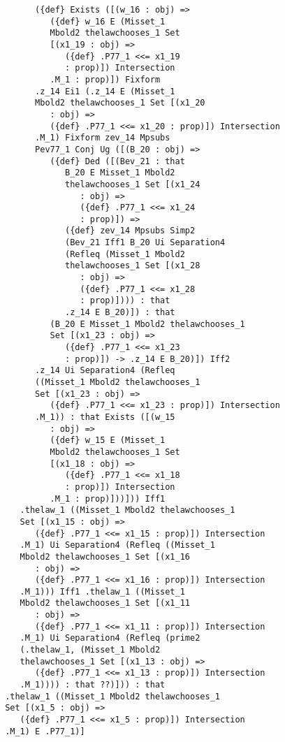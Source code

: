 \documentclass[12pt]{article}
\begin{document}
\begin{verbatim}
             ({def} Exists ([(w_16 : obj) => 
                ({def} w_16 E (Misset_1 
                Mbold2 thelawchooses_1 Set 
                [(x1_19 : obj) => 
                   ({def} .P77_1 <<= x1_19 
                   : prop)]) Intersection 
                .M_1 : prop)]) Fixform 
             .z_14 Ei1 (.z_14 E (Misset_1 
             Mbold2 thelawchooses_1 Set [(x1_20 
                : obj) => 
                ({def} .P77_1 <<= x1_20 : prop)]) Intersection 
             .M_1) Fixform zev_14 Mpsubs 
             Pev77_1 Conj Ug ([(B_20 : obj) => 
                ({def} Ded ([(Bev_21 : that 
                   B_20 E Misset_1 Mbold2 
                   thelawchooses_1 Set [(x1_24 
                      : obj) => 
                      ({def} .P77_1 <<= x1_24 
                      : prop)]) => 
                   ({def} zev_14 Mpsubs Simp2 
                   (Bev_21 Iff1 B_20 Ui Separation4 
                   (Refleq (Misset_1 Mbold2 
                   thelawchooses_1 Set [(x1_28 
                      : obj) => 
                      ({def} .P77_1 <<= x1_28 
                      : prop)]))) : that 
                   .z_14 E B_20)]) : that 
                (B_20 E Misset_1 Mbold2 thelawchooses_1 
                Set [(x1_23 : obj) => 
                   ({def} .P77_1 <<= x1_23 
                   : prop)]) -> .z_14 E B_20)]) Iff2 
             .z_14 Ui Separation4 (Refleq 
             ((Misset_1 Mbold2 thelawchooses_1 
             Set [(x1_23 : obj) => 
                ({def} .P77_1 <<= x1_23 : prop)]) Intersection 
             .M_1)) : that Exists ([(w_15 
                : obj) => 
                ({def} w_15 E (Misset_1 
                Mbold2 thelawchooses_1 Set 
                [(x1_18 : obj) => 
                   ({def} .P77_1 <<= x1_18 
                   : prop)]) Intersection 
                .M_1 : prop)]))])) Iff1 
          .thelaw_1 ((Misset_1 Mbold2 thelawchooses_1 
          Set [(x1_15 : obj) => 
             ({def} .P77_1 <<= x1_15 : prop)]) Intersection 
          .M_1) Ui Separation4 (Refleq ((Misset_1 
          Mbold2 thelawchooses_1 Set [(x1_16 
             : obj) => 
             ({def} .P77_1 <<= x1_16 : prop)]) Intersection 
          .M_1))) Iff1 .thelaw_1 ((Misset_1 
          Mbold2 thelawchooses_1 Set [(x1_11 
             : obj) => 
             ({def} .P77_1 <<= x1_11 : prop)]) Intersection 
          .M_1) Ui Separation4 (Refleq (prime2 
          (.thelaw_1, (Misset_1 Mbold2 
          thelawchooses_1 Set [(x1_13 : obj) => 
             ({def} .P77_1 <<= x1_13 : prop)]) Intersection 
          .M_1)))) : that ??)])) : that 
       .thelaw_1 ((Misset_1 Mbold2 thelawchooses_1 
       Set [(x1_5 : obj) => 
          ({def} .P77_1 <<= x1_5 : prop)]) Intersection 
       .M_1) E .P77_1)]



\end{verbatim}
\end{document}

